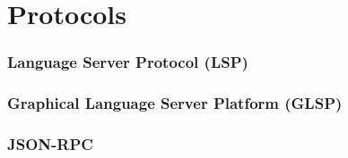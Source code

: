 \section{Protocols}\label{sec:protocols}

\subsubsection{Language Server Protocol (LSP)}\label{sec:lsp}

\subsubsection{Graphical Language Server Platform (GLSP)}\label{sec:glsp}

\subsubsection{JSON-RPC}
